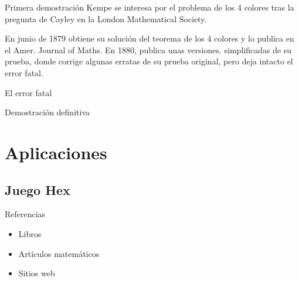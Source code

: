 \documentclass[spanish,utf8]{beamer}
\begin{document}
\begin{frame}{\insertsection}\transblindsvertical
\begin{block}{Primera demostración}
Kempe se interesa por el problema de los 4 colores tras la pregunta de Cayley en la London Mathematical Society.
\end{block}

\begin{block}{}
En junio de 1879 obtiene su solución del teorema de los 4 colores y lo publica en el Amer. Journal of Maths. En 1880, publica unas versiones. simplificadas de su prueba, donde corrige algunas erratas de su prueba original, pero deja intacto el error fatal.
\end{block}
    \end{frame}

\begin{frame}{\insertsection}\transblindsvertical
El error fatal
\end{frame}

\begin{frame}{\insertsection}\transblindsvertical
Demostración definitiva
\end{frame}

\section{Aplicaciones}

\subsection{Juego Hex}

\begin{frame}{\insertsection}\transblindsvertical

\end{frame}


\begin{frame}[allowframebreaks]{Referencias}\transblindsvertical
\begin{itemize}
	\item Libros
	\nocite{*}
	\printbibliography[heading=none,keyword=book]
	\item Artículos matemáticos
	\printbibliography[heading=none,keyword=paper]
	\item Sitios web
	\printbibliography[heading=none,keyword=online]
\end{itemize}
\end{frame}
\end{document}
